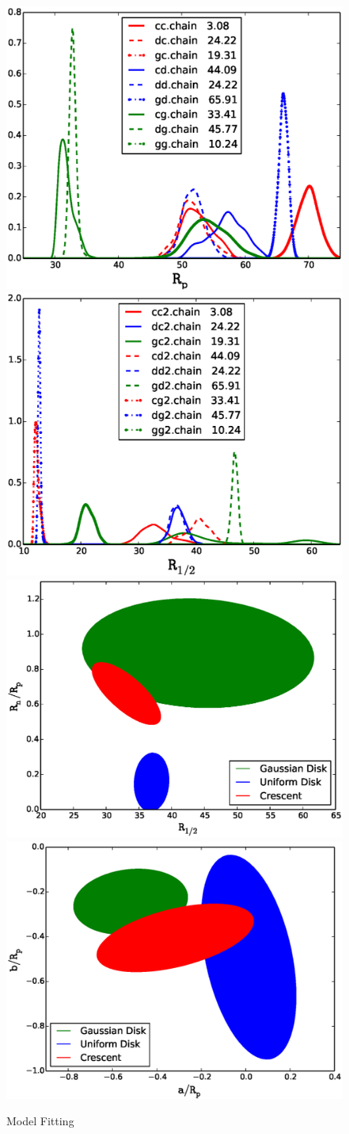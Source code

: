 \begin{figure}
\centering
  \includegraphics[width=0.45\hsize]{plots/Rp4all.eps}
  \includegraphics[width=0.45\hsize]{plots/Rhalf4all.eps}\\
  \includegraphics[width=0.45\hsize]{plots/Rhalf_RnRp.eps}
  \includegraphics[width=0.45\hsize]{plots/aRp_bRp.eps}

\caption{\label{fig:mcmc} Model Fitting}
\end{figure}


